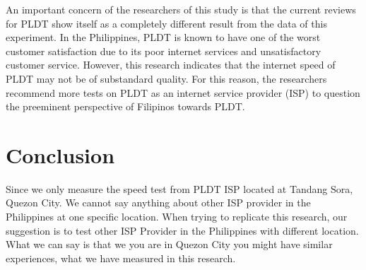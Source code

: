 \documentclass[conference]{IEEEtran}
\begin{document}
An important concern of the researchers of this study is that the current reviews for PLDT show itself as a completely different result from the data of this experiment. In the Philippines, PLDT is known to have one of the worst customer satisfaction due to its poor internet services and unsatisfactory customer service. However, this research indicates that the internet speed of PLDT may not be of substandard quality. For this reason, the researchers recommend more tests on PLDT as an internet service provider (ISP) to question the preeminent perspective of Filipinos towards PLDT.


\section{Conclusion}
Since we only measure the speed test from PLDT ISP located at Tandang Sora, Quezon City. We cannot say anything about other ISP
provider in the Philippines at one specific location. When trying to replicate this research, our suggestion is to test other ISP 
Provider in the Philippines with different location. What we can say is that we you are in Quezon City you might have similar experiences, 
what we have measured in this research. 
\end{document}

